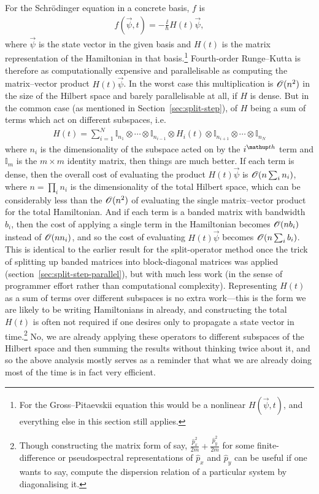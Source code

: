 For the Schr\"odinger equation in a concrete basis, $f$ is
\begin{align}
f(\vec \psi, t) = -\frac\ii\hbar H(t)\vec \psi,
\end{align}
where $\vec \psi$ is the state vector in the given basis and $H(t)$ is the matrix representation of the Hamiltonian in that basis.\footnote{For the Gross--Pitaevskii equation this would be a nonlinear $H(\vec \psi, t)$, and everything else in this section still applies.} Fourth-order Runge--Kutta is therefore as computationally expensive and parallelisable as computing the matrix--vector product $H(t)\vec\psi$. In the worst case this multiplication is $\mathscr{O}(n^2)$ in the size of the Hilbert space and barely parallelisable at all, if $H$ is dense. But in the common case (as mentioned in Section~\ref{sec:split-step}), of $H$ being a sum of terms which act on different subspaces, i.e.
\begin{align}
H(t) = \sum_{i=1}^N \mathbb{I}_{n_1} \otimes \cdots  \otimes \mathbb{I}_{n_{i-1}}
\otimes  H_i(t) \otimes  
 \mathbb{I}_{n_{i+1}} \otimes \cdots \otimes \mathbb{I}_{n_N}
\end{align}
where $n_i$ is the dimensionality of the subspace acted on by the $i^\up{th}$ term and $\mathbb{I}_m$ is the $m\times m$ identity matrix, then things are much better. If each term is dense, then the overall cost of evaluating the product $H(t)\vec\psi$ is $\mathscr{O}(n\sum_i n_i)$, where $n = \prod_i n_i$ is the dimensionality of the total Hilbert space, which can be considerably less than the $\mathscr{O}(n^2)$ of evaluating the single  matrix--vector product for the total Hamiltonian. And if each term is a banded matrix with bandwidth $b_i$, then the cost of applying a single term in the Hamiltonian becomes $\mathscr{O}(n b_i)$ instead of $\mathscr{O}(n n_i)$, and so the cost of evaluating $H(t)\vec\psi$ becomes $\mathscr{O}(n\sum_i b_i)$. This is identical to the earlier result for the split-operator method once the trick of splitting up banded matrices into block-diagonal matrices was applied (section~\ref{sec:split-step-parallel}), but with much less work (in the sense of programmer effort rather than computational complexity). Representing $H(t)$ as a sum of terms over different subspaces is no extra work---this is the form we are likely to be writing Hamiltonians in already, and constructing the total $H(t)$ is often not required if one desires only to propagate a state vector in time.\footnote{Though constructing the matrix form of say, $\frac {\hat p_x^2} {2m} + \frac {\hat p_y^2} {2m}$ for some finite-difference or pseudospectral representations of $\hat p_x$ and $\hat p_y$ can be useful if one wants to say, compute the dispersion relation of a particular system by diagonalising it.} No, we are already applying these operators to different subspaces of the Hilbert space and then summing the results without thinking twice about it, and so the above analysis mostly serves as a reminder that what we are already doing most of the time is in fact very efficient. 

